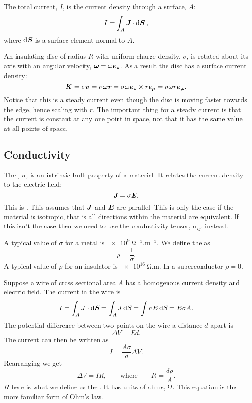     The total current, \(I\), is the current density through a surface, \(A\):
    \[I = \int_A \bm{J}\cdot\dd{\bm{S}},\]
    where \(\dd{\bm{S}}\) is a surface element normal to \(A\).
    
    \begin{example}
        An insulating disc of radius \(R\) with uniform charge density, \(\sigma\), is rotated about its axis with an angular velocity, \(\bm{\omega} = \omega\bm{e_{z}}\).
        As a result the disc has a surface current density:
        \[\bm{K} = \sigma\bm{v} = \sigma\bm{\omega}\bm{r} = \sigma\omega\bm{e_{z}}\times r\bm{e_{\rho}} = \sigma\omega r\bm{e_{\varphi}}.\]
        Notice that this is a steady current even though the disc is moving faster towards the edge, hence scaling with \(r\).
        The important thing for a steady current is that the current is constant at any one point in space, not that it has the same value at all points of space.
    \end{example}
    
    \subsection{Conductivity}
    The , \(\sigma\), is an intrinsic bulk property of a material.
    It relates the current density to the electric field:
    \[\bm{J} = \sigma\bm{E}.\]
    This is .
    This assumes that \(\bm{J}\) and \(\bm{E}\) are parallel.
    This is only the case if the material is isotropic, that is all directions within the material are equivalent.
    If this isn't the case then we need to use the conductivity tensor, \(\sigma_{ij}\), instead.
    
    A typical value of \(\sigma\) for a metal is \(\SI{e9}{\ohm^{-1}.\metre^{-1}}\).
    We define the  as
    \[\rho = \frac{1}{\sigma}.\]
    A typical value of \(\rho\) for an insulator is \(\SI{e16}{\ohm.\metre}\).
    In a superconductor \(\rho = 0\).
    
    Suppose a wire of cross sectional area \(A\) has a homogenous current density and electric field.
    The current in the wire is
    \[I = \int_A\bm{J}\cdot\dd{\bm{S}} = \int_A J\dd{S} = \int \sigma E\dd{S} = E\sigma A.\]
    The potential difference between two points on the wire a distance \(d\) apart is
    \[\Delta V = Ed.\]
    The current can then be written as
    \[I = \frac{A\sigma}{d}\Delta V.\]
    Rearranging we get
    \[\Delta V = IR,\qquad\text{where}\qquad R = \frac{d\rho}{A}.\]
    \(R\) here is what we define as the .
    It has units of ohms, \(\si{\ohm}\).
    This equation is the more familiar form of Ohm's law.
    
